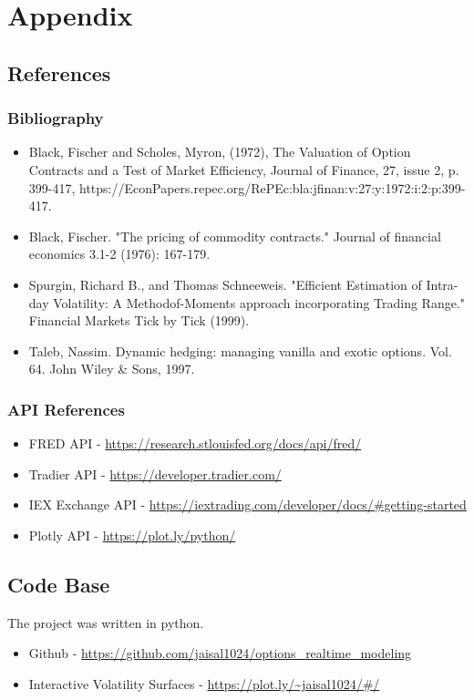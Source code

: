 \documentclass{article}
\begin{document}
\section{Appendix}
\subsection{References}
\subsubsection{Bibliography}

\begin{itemize}
\item Black, Fischer and Scholes, Myron, (1972), The Valuation of Option Contracts and a Test of Market Efficiency, Journal of Finance, 27, issue 2, p. 399-417, https://EconPapers.repec.org/RePEc:bla:jfinan:v:27:y:1972:i:2:p:399-417.
\item Black, Fischer. "The pricing of commodity contracts." Journal of financial economics 3.1-2 (1976): 167-179.
\item Spurgin, Richard B., and Thomas Schneeweis. "Efficient Estimation of Intra-day Volatility: A Methodof-Moments approach incorporating Trading Range." Financial Markets Tick by Tick (1999).
\item Taleb, Nassim. Dynamic hedging: managing vanilla and exotic options. Vol. 64. John Wiley & Sons, 1997.
\end{itemize}

\subsubsection{API References}
\begin{itemize}
\item FRED API - \url{https://research.stlouisfed.org/docs/api/fred/}
\item Tradier API - \url{https://developer.tradier.com/}
\item IEX Exchange API - \url{https://iextrading.com/developer/docs/#getting-started}
\item Plotly API - \url{https://plot.ly/python/}
\end{itemize}


\subsection{Code Base}
\begin{flushleft}
 The project was written in python. 
\begin{itemize}
\item Github -  \url{https://github.com/jaisal1024/options_realtime_modeling}
\item  Interactive Volatility Surfaces - \url{https://plot.ly/~jaisal1024/#/}
\end{itemize}
\end{flushleft}
\end{document}
